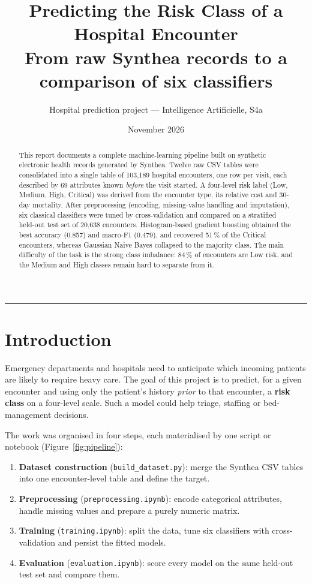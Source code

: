 \documentclass[11pt,a4paper]{article}
\title{\vspace{-1.2cm}
  {\LARGE\bfseries Predicting the Risk Class of a Hospital Encounter}\\[0.4em]
  {\large From raw Synthea records to a comparison of six classifiers}\vspace{-0.2cm}}
\author{Hospital prediction project --- Intelligence Artificielle, S4a}
\date{November 2026}
\newcommand{\code}[1]{\texttt{\textcolor{codegrey}{#1}}}
\newcommand{\sect}[1]{\section{#1}}
\begin{document}
\maketitle

\begin{abstract}
\noindent
This report documents a complete machine-learning pipeline built on synthetic electronic health
records generated by Synthea. Twelve raw CSV tables were consolidated into a single table of
103{,}189 hospital encounters, one row per visit, each described by 69 attributes known
\emph{before} the visit started. A four-level risk label (Low, Medium, High, Critical) was derived
from the encounter type, its relative cost and 30-day mortality. After preprocessing (encoding,
missing-value handling and imputation), six classical classifiers were tuned by cross-validation
and compared on a stratified held-out test set of 20{,}638 encounters. Histogram-based gradient
boosting obtained the best accuracy (0.857) and macro-F1 (0.479), and recovered 51\,\% of the
Critical encounters, whereas Gaussian Naive Bayes collapsed to the majority class. The main
difficulty of the task is the strong class imbalance: 84\,\% of encounters are Low risk, and the
Medium and High classes remain hard to separate from it.
\end{abstract}

\tableofcontents
\vspace{0.5em}
\hrule
\vspace{1em}

\sect{Introduction}

Emergency departments and hospitals need to anticipate which incoming patients are likely to
require heavy care. The goal of this project is to predict, for a given encounter and using only
the patient's history \emph{prior} to that encounter, a \textbf{risk class} on a four-level scale.
Such a model could help triage, staffing or bed-management decisions.

The work was organised in four steps, each materialised by one script or notebook
(Figure~\ref{fig:pipeline}):

\begin{enumerate}[itemsep=2pt]
  \item \textbf{Dataset construction} (\code{build\_dataset.py}): merge the Synthea CSV tables
        into one encounter-level table and define the target.
  \item \textbf{Preprocessing} (\code{preprocessing.ipynb}): encode categorical attributes,
        handle missing values and prepare a purely numeric matrix.
  \item \textbf{Training} (\code{training.ipynb}): split the data, tune six classifiers with
        cross-validation and persist the fitted models.
  \item \textbf{Evaluation} (\code{evaluation.ipynb}): score every model on the same held-out
        test set and compare them.
\end{enumerate}
\end{document}

